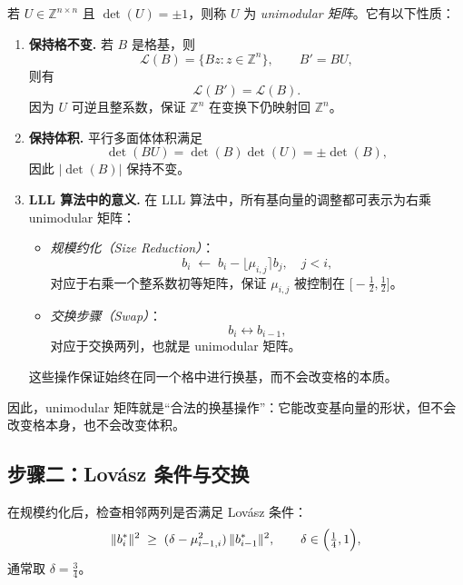 \begin{proposition}
若 $U \in \mathbb{Z}^{n \times n}$ 且 $\det(U) = \pm 1$，则称 $U$ 为 \emph{unimodular 矩阵}。它有以下性质：

\begin{enumerate}
    \item \textbf{保持格不变.}  
    若 $B$ 是格基，则
    \[
    \mathcal{L}(B) = \{ Bz : z \in \mathbb{Z}^n \}, \qquad
    B' = BU,
    \]
    则有
    \[
    \mathcal{L}(B') = \mathcal{L}(B).
    \]
    因为 $U$ 可逆且整系数，保证 $\mathbb{Z}^n$ 在变换下仍映射回 $\mathbb{Z}^n$。

    \item \textbf{保持体积.}  
    平行多面体体积满足
    \[
    \det(BU) = \det(B)\det(U) = \pm \det(B),
    \]
    因此 $|\det(B)|$ 保持不变。

    \item \textbf{LLL 算法中的意义.}  
    在 LLL 算法中，所有基向量的调整都可表示为右乘 unimodular 矩阵：
    \begin{itemize}
        \item \emph{规模约化（Size Reduction）}：  
        \[
        b_i \;\leftarrow\; b_i - \lfloor \mu_{i,j} \rceil b_j, \quad j<i ,
        \]
        对应于右乘一个整系数初等矩阵，保证 $\mu_{i,j}$ 被控制在 $\bigl[-\tfrac{1}{2},\tfrac{1}{2}\bigr]$。
        \item \emph{交换步骤（Swap）}：  
        \[
        b_i \leftrightarrow b_{i-1},
        \]
        对应于交换两列，也就是 unimodular 矩阵。
    \end{itemize}
    这些操作保证始终在同一个格中进行换基，而不会改变格的本质。
\end{enumerate}

\noindent
因此，unimodular 矩阵就是“合法的换基操作”：它能改变基向量的形状，但不会改变格本身，也不会改变体积。
\end{proposition}

\subsection*{步骤二：Lovász 条件与交换}
在规模约化后，检查相邻两列是否满足 Lovász 条件：
\[
\|b_i^*\|^2 \;\ge\; (\delta - \mu_{i-1,i}^2)\,\|b_{i-1}^*\|^2,
\qquad \delta \in \Bigl(\tfrac{1}{4},1\Bigr),
\]
通常取 $\delta = \tfrac{3}{4}$。

